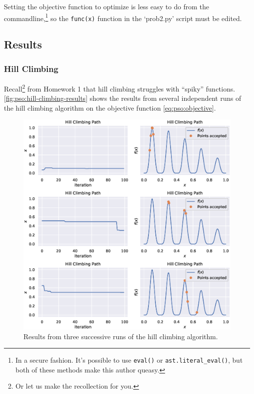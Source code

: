 \documentclass[12pt]{article}
\begin{document}
Setting the objective function to optimize is less easy to do from the commandline,\footnote{In a secure fashion. It's possible to use \texttt{eval()} or \texttt{ast.literal_eval()}, but both of these methods make this author queasy.}
so the \texttt{func(x)} function in the `prob2.py' script must be edited.

\subsection{Results}
\subsubsection{Hill Climbing}
Recall\footnote{Or let us make the recollection for you.} from Homework 1 that hill climbing struggles with ``spiky'' functions.
\autoref{fig:pso:hill-climbing-results} shows the results from several independent runs of the hill climbing algorithm on the objective function \autoref{eq:pso:objective}.

\begin{figure}[H]
    \centering
    \includegraphics[width=\textwidth]{figures/prob1-hill-climbing-results.eps}
    \caption{Results from three successive runs of the hill climbing algorithm.}\label{fig:pso:hill-climbing-results}
\end{figure}
\end{document}
